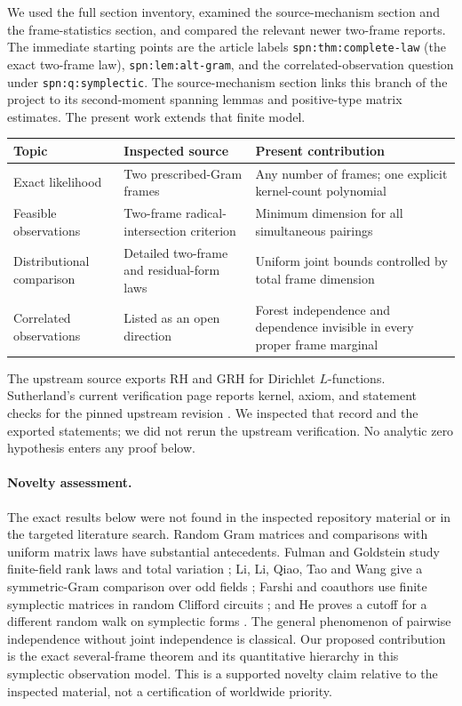 \documentclass[11pt,letterpaper]{article}
\theoremstyle{definition}
\theoremstyle{remark}
\begin{document}
We used the full section inventory, examined the source-mechanism section and the frame-statistics section, and compared the relevant newer two-frame reports. The immediate starting points are the article labels \texttt{spn:thm:complete-law} (the exact two-frame law), \texttt{spn:lem:alt-gram}, and the correlated-observation question under \texttt{spn:q:symplectic}. The source-mechanism section links this branch of the project to its second-moment spanning lemmas and positive-type matrix estimates. The present work extends that finite model.

\begin{center}\small
\begin{tabularx}{\linewidth}{@{}p{.28\linewidth}XX@{}}
\toprule
Topic & Inspected source & Present contribution\\
\midrule
Exact likelihood & Two prescribed-Gram frames & Any number of frames; one explicit kernel-count polynomial\\
Feasible observations & Two-frame radical-intersection criterion & Minimum dimension for all simultaneous pairings\\
Distributional comparison & Detailed two-frame and residual-form laws & Uniform joint bounds controlled by total frame dimension\\
Correlated observations & Listed as an open direction & Forest independence and dependence invisible in every proper frame marginal\\
\bottomrule
\end{tabularx}
\end{center}

The upstream source exports RH and GRH for Dirichlet $L$-functions. Sutherland's current verification page reports kernel, axiom, and statement checks for the pinned upstream revision \cite{Sutherland}. We inspected that record and the exported statements; we did not rerun the upstream verification. No analytic zero hypothesis enters any proof below.

\paragraph{Novelty assessment.}
The exact results below were not found in the inspected repository material or in the targeted literature search. Random Gram matrices and comparisons with uniform matrix laws have substantial antecedents. Fulman and Goldstein study finite-field rank laws and total variation \cite{FulmanGoldstein}; Li, Li, Qiao, Tao and Wang give a symmetric-Gram comparison over odd fields \cite{LiEtAl}; Farshi and coauthors use finite symplectic matrices in random Clifford circuits \cite{Farshi}; and He proves a cutoff for a different random walk on symplectic forms \cite{He}. The general phenomenon of pairwise independence without joint independence is classical. Our proposed contribution is the exact several-frame theorem and its quantitative hierarchy in this symplectic observation model. This is a supported novelty claim relative to the inspected material, not a certification of worldwide priority.
\end{document}
